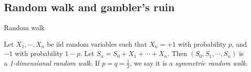 \subsection{Random walk and gambler's ruin}

%
\begin{note}
  \begin{field}
    Random walk
  \end{field}
  \begin{field}
    \begin{defi}
      Let $X_1, \cdots, X_n$ be iid random variables such that $X_n = +1$ with probability $p$, and $-1$ with probability $1 - p$. Let $S_n = S_0 + X_1 + \cdots + X_n$. Then $(S_0, S_1, \cdots, S_n)$ is a \emph{1-dimensional random walk}.
      If $p = q = \frac{1}{2}$, we say it is a \emph{symmetric random walk}.
    \end{defi}
  \end{field}
  \xplain{}%
\end{note}

